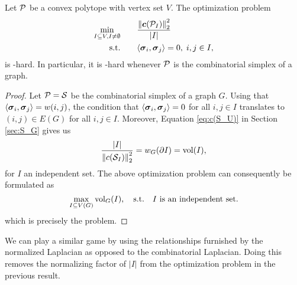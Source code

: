 \begin{lemma}
	Let $\P$ be a convex polytope with vertex set $V$. The optimization problem 
	\begin{alignat*}{2}
	\min_{I\subset V, I\neq\emptyset} & \quad &&  \frac{\norm{\cent(\P_I)}_2^2}{|I|} \\
	\text{s.t.}&  &&  \la \sv_i,\sv_j\ra=0,\; i,j\in I,
	\end{alignat*}
	is \NP-hard. In particular, it is \NP-hard whenever $\P$ is the combinatorial simplex of a graph. 
\end{lemma}
\begin{proof}
	Let $\P=\splx$ be the combinatorial simplex of a graph $G$. Using that $\la \sv_i,\sv_j\ra = w(i,j)$, the condition that $\la \sv_i,\sv_j\ra =0$ for all $i,j\in I$ translates to $(i,j)\in E(G)$ for all $i,j\in I$. Moreover, Equation \eqref{eq:c(S_U)} in Section \ref{sec:S_G} gives us  
	\begin{align*}
	\frac{|I|}{\norm{c(\splx_I)}_2^2} = w_G(\partial I) = \vol(I),
	\end{align*}
	for $I$ an independent set. 
	The above optimization problem can consequently be formulated as 
	\[\max_{I\subset V(G)} \vol_G(I),\quad  \text{s.t.} \quad I \text{ is an independent set}.\]
	which is precisely the \vwis problem. 
	\end{proof}
	
We can play a similar game by using the relationships furnished by the normalized Laplacian as opposed to the combinatorial Laplacian. Doing this removes the normalizing factor of $|I|$ from the optimization problem in the previous result.  

